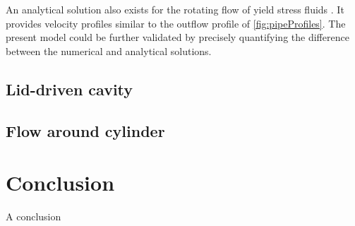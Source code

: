 \documentclass[11 pt]{report}
\begin{document}
An analytical solution also exists for the rotating flow of yield stress fluids \cite{circularProfile}. It provides velocity profiles similar to the outflow profile of \cref{fig:pipeProfiles}. The present model could be further validated by precisely quantifying the difference between the numerical and analytical solutions.


\section{Lid-driven cavity}

\section{Flow around cylinder}

\chapter*{Conclusion}
A conclusion


%         
%         


\end{document}
